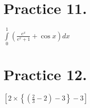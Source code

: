 \documentclass[a4paper,12pt]{article}
\begin{document}
\section{Practice 11.}
$\displaystyle\int\limits_0^1\left(\frac{e^x}{e^x+1}+\cos x\right)dx$


%
%
%
%
%
%
%
\section*{Practice 12.}
$\left[2\times\left\{\left(\frac{2}{3}-2\right)-3\right\}-3\right]$
\end{document}
